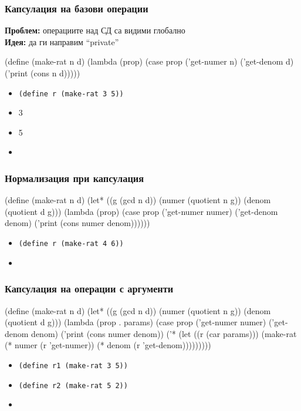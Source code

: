 \documentclass{beamer}
\begin{document}
\begin{frame}[fragile]
  \frametitle{Капсулация на базови операции}
  \textbf{Проблем:} операциите над СД са видими глобално\\[1em]
  \pause
  \textbf{Идея:} да ги направим ``private''
  \pause
\begin{semiverbatim}
(define (make-rat n d)
  (lambda (prop)
    (case prop
      ('get-numer n)
      ('get-denom d)
      ('print (cons n d)))))
\end{semiverbatim}
  \pause
  \begin{itemize}
  \item \tt{(define r (make-rat 3 5))}
  \item {}3
  \item {}5
  \item {}
  \end{itemize}
\end{frame}

\begin{frame}[fragile]
  \frametitle{Нормализация при капсулация}
\begin{semiverbatim}
(define (make-rat n d)
  \alert{(let* ((g (gcd n d))
         (numer (quotient n g))
         (denom (quotient d g)))}
   (lambda (prop)
    (case prop
      ('get-numer numer)
      ('get-denom denom)
      ('print (cons numer denom))))))
\end{semiverbatim}
  \pause
  \begin{itemize}
  \item \tt{(define r (make-rat 4 6))}
  \item {}
  \end{itemize}
\end{frame}

\begin{frame}[fragile]
  \frametitle{Капсулация на операции с аргументи}
\small
\begin{semiverbatim}
(define (make-rat n d)
  (let* ((g (gcd n d))
         (numer (quotient n g))
         (denom (quotient d g)))
   (lambda (prop . params)
     (case prop
       ('get-numer numer)
       ('get-denom denom)
       ('print (cons numer denom))
       \alert{('* (let ((r (car params)))
            (make-rat (* numer (r 'get-numer))
                      (* denom (r 'get-denom)))))}))))
\end{semiverbatim}
  \pause
  \begin{itemize}
  \item \tt{(define r1 (make-rat 3 5))}
  \item \tt{(define r2 (make-rat 5 2))}
  \item {}
  \end{itemize}
\end{frame}
\end{document}

